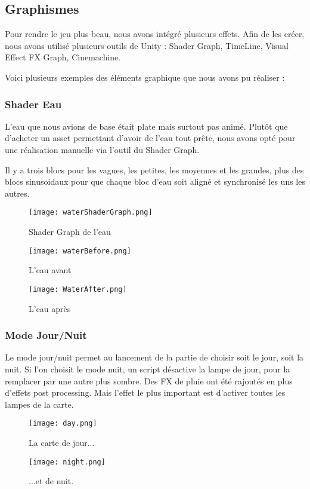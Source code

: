 \subsection{Graphismes}

Pour rendre le jeu plus beau, nous avons intégré plusieurs effets.
Afin de les créer, nous avons utilisé plusieurs outils de Unity :
Shader Graph, TimeLine, Visual Effect FX Graph, Cinemachine.

Voici plusieurs exemples des éléments graphique que nous avons pu réaliser : 


\subsubsection{Shader Eau}

L'eau que nous avions de base était plate mais surtout pas animé.
Plutôt que d'acheter un asset permettant d'avoir de l'eau tout prête,
nous avons opté pour une réalisation manuelle via l'outil du Shader Graph.

Il y a trois blocs pour les vagues, les petites, les moyennes et les grandes,
plus des blocs sinusoidaux pour que chaque bloc d'eau soit aligné et synchronisé les uns les autres.
\begin{figure}[hbt!]
    \centering
    \texttt{[image: waterShaderGraph.png]}
    \caption{Shader Graph de l'eau}
\end{figure}
\begin{figure}[hbt!]
    \centering
    \texttt{[image: waterBefore.png]}
    \caption{L'eau avant}
    \texttt{[image: WaterAfter.png]}
    \caption{L'eau après}
\end{figure}
\FloatBarrier



\subsubsection{Mode Jour/Nuit}
Le mode jour/nuit permet au lancement de la partie
de choisir soit le jour, soit la nuit. Si l'on choisit le mode nuit, un script désactive la lampe de jour,
 pour la remplacer par une autre plus sombre. Des FX de pluie ont été rajoutés en plus d'effets post processing.
Mais l'effet le plus important est d'activer toutes les lampes de la carte.
\begin{figure}[hbt!]
    \centering
    \texttt{[image: day.png]}
    \caption{La carte de jour...}

    \texttt{[image: night.png]}
    \caption{...et de nuit.}

\end{figure}

